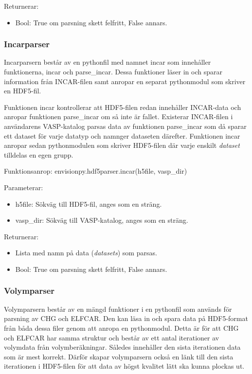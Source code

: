 \documentclass[10pt,oneside,swedish]{article}
\providecommand{\tightlist}{%
  \setlength{\itemsep}{0pt}\setlength{\parskip}{0pt}}
\begin{document}
Returnerar:

\begin{itemize}
\tightlist
\item
  Bool: True om parsning skett felfritt, False annars.
\end{itemize}

\subsubsection{Incarparser}\label{incarparser}

Incarparsern består av en pythonfil med namnet incar som innehåller
funktionerna, incar och parse\_incar. Dessa funktioner läser in och
sparar information från INCAR-filen samt anropar en separat pythonmodul
som skriver en HDF5-fil.

Funktionen incar kontrollerar att HDF5-filen redan innehåller INCAR-data
och anropar funktionen parse\_incar om så inte är fallet. Existerar
INCAR-filen i användarens VASP-katalog parsas data av funktionen
parse\_incar som då sparar ett dataset för varje datatyp och namnger
dataseten därefter. Funktionen incar anropar sedan pythonmodulen som
skriver HDF5-filen där varje enskilt \emph{dataset} tilldelas en egen
grupp.

Funktionsanrop: envisionpy.hdf5parser.incar(h5file, vasp\_dir)

Parameterar:

\begin{itemize}
\tightlist
\item
  h5file: Sökväg till HDF5-fil, anges som en sträng.
\item
  vasp\_dir: Sökväg till VASP-katalog, anges som en sträng.
\end{itemize}

Returnerar:

\begin{itemize}
\tightlist
\item
  Lista med namn på data (\emph{datasets}) som parsas.
\item
  Bool: True om parsning skett felfritt, False annars.
\end{itemize}

\subsubsection{Volymparser}\label{volymparser}

Volymparsern består av en mängd funktioner i en pythonfil som används
för parsning av CHG och ELFCAR. Den kan läsa in och spara data på
HDF5-format från båda dessa filer genom att anropa en pythonmodul. Detta
är för att CHG och ELFCAR har samma struktur och består av ett antal
iterationer av volymdata från volymberäkningar. Således innehåller den
sista iterationen data som är mest korrekt. Därför skapar volymparsern
också en länk till den sista iterationen i HDF5-filen för att data av
högst kvalitet lätt ska kunna plockas ut.
\end{document}
